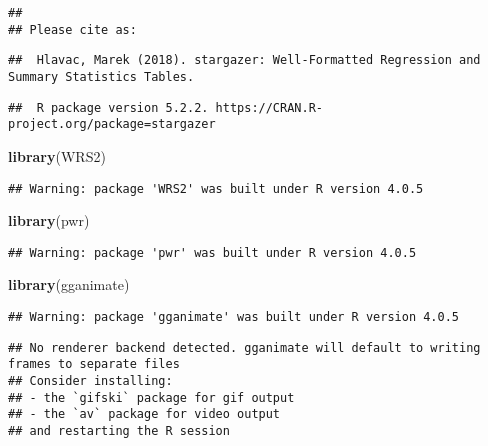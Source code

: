 \documentclass[
]{article}
\newenvironment{Shaded}{\begin{snugshade}}{\end{snugshade}}
\newcommand{\KeywordTok}[1]{\textcolor[rgb]{0.13,0.29,0.53}{\textbf{#1}}}
\newcommand{\NormalTok}[1]{#1}
\begin{document}
\begin{verbatim}
## 
## Please cite as:
\end{verbatim}

\begin{verbatim}
##  Hlavac, Marek (2018). stargazer: Well-Formatted Regression and Summary Statistics Tables.
\end{verbatim}

\begin{verbatim}
##  R package version 5.2.2. https://CRAN.R-project.org/package=stargazer
\end{verbatim}

\begin{Shaded}
\begin{Highlighting}[]
\KeywordTok{library}\NormalTok{(WRS2)}
\end{Highlighting}
\end{Shaded}

\begin{verbatim}
## Warning: package 'WRS2' was built under R version 4.0.5
\end{verbatim}

\begin{Shaded}
\begin{Highlighting}[]
\KeywordTok{library}\NormalTok{(pwr)}
\end{Highlighting}
\end{Shaded}

\begin{verbatim}
## Warning: package 'pwr' was built under R version 4.0.5
\end{verbatim}

\begin{Shaded}
\begin{Highlighting}[]
\KeywordTok{library}\NormalTok{(gganimate)}
\end{Highlighting}
\end{Shaded}

\begin{verbatim}
## Warning: package 'gganimate' was built under R version 4.0.5
\end{verbatim}

\begin{verbatim}
## No renderer backend detected. gganimate will default to writing frames to separate files
## Consider installing:
## - the `gifski` package for gif output
## - the `av` package for video output
## and restarting the R session
\end{verbatim}
\end{document}
